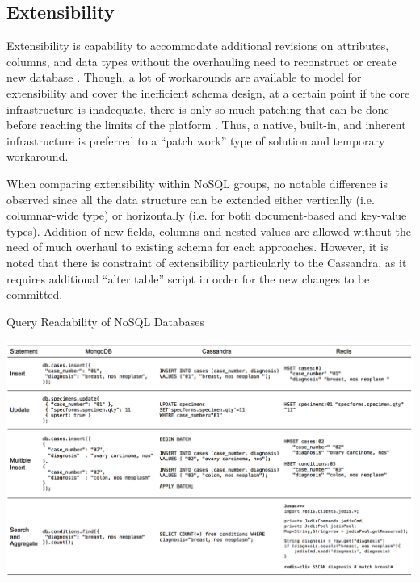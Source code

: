 \documentclass[5p]{elsarticle}
\begin{document}
\subsection{Extensibility}
Extensibility is capability to accommodate additional revisions on attributes, columns, and data types without the overhauling need to reconstruct or create new database \cite{S.Wang2013268}. 
Though, a lot of workarounds are available to model for extensibility and cover the inefficient schema design, 
at a certain point if the core infrastructure is inadequate, there is only so much patching that can be done before reaching the limits of the platform \cite{N.Ramachandran2016}.
Thus, a native, built-in, and inherent infrastructure is preferred to a “patch work” type of solution and temporary workaround.

When comparing extensibility within NoSQL groups, no notable difference is observed since all the data structure can be extended either 
vertically (i.e. columnar-wide type) or horizontally (i.e. for both document-based and key-value types). 
Addition of new fields, columns and nested values are allowed without the need of much overhaul to existing schema for each approaches. 
However, it is noted that there is constraint of extensibility particularly to the Cassandra, as it requires additional 
“alter table” script in order for the new changes to be committed.

\begin{table}[ht]
    \centering
    \caption{Query Readability of NoSQL Databases}
    \includegraphics[width=18.5cm,keepaspectratio]{Query}
    \label{fig.Query}
\end{table}
\end{document}
